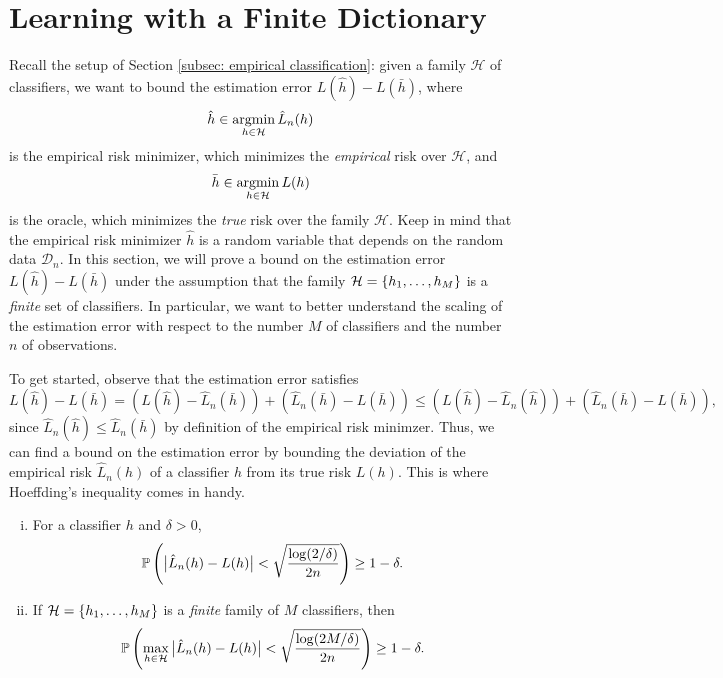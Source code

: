 \section{Learning with a Finite Dictionary}

Recall the setup of Section \ref{subsec: empirical classification}: given a family $\mathcal{H}$ of classifiers, we want to bound the estimation error $L(\hat h) - L(\bar h)$, where
\[
    \hat h \in \operatorname*{argmin}_{h \in \mathcal{H}} \hat L_n(h)
\]
is the empirical risk minimizer, which minimizes the \emph{empirical} risk over $\mathcal{H}$, and
\[
    \bar h \in \operatorname*{argmin}_{h \in \mathcal{H}} L(h)
\]
is the oracle, which minimizes the \emph{true} risk over the family $\mathcal{H}$. Keep in mind that the empirical risk minimizer $\hat h$ is a random variable that depends on the random data $\mathcal{D}_n$. In this section, we will prove a bound on the estimation error $L(\hat h) - L(\bar h)$ under the assumption that the family $\mathcal{H} = \left\{h_1, \dots, h_M\right\}$ is a \emph{finite} set of classifiers. In particular, we want to better understand the scaling of the estimation error with respect to the number $M$ of classifiers and the number $n$ of observations.

To get started, observe that the estimation error satisfies
\[
    L(\hat h) - L(\bar h) = \left(L(\hat h) - \hat L_n(\bar h)\right) + \left(\hat L_n(\bar h) - L(\bar h)\right) \leq \left(L(\hat h) - \hat L_n(\hat h)\right) + \left(\hat L_n(\bar h) - L(\bar h)\right),
\]
since $\hat L_n(\hat h) \leq \hat L_n(\bar h)$ by definition of the empirical risk minimzer. Thus, we can find a bound on the estimation error by bounding the deviation of the empirical risk $\hat L_n(h)$ of a classifier $h$ from its true risk $L(h)$. This is where Hoeffding's inequality comes in handy.

\begin{theorem}
\label{thm: empirical vs true risk}
\begin{enumerate}[(i)]
    \item For a classifier $h$ and $\delta > 0$,
    \[
        \mathbb{P}\left(\big\lvert \hat L_n(h) - L(h) \big\rvert < \sqrt{\frac{\log(2/\delta)}{2n}}\right) \geq 1 - \delta.
    \]

    \item If $\mathcal{H} = \left\{h_1, \dots, h_M\right\}$ is a \emph{finite} family of $M$ classifiers, then
    \[
        \mathbb{P}\left(\max_{h \in \mathcal{H}} \big\lvert \hat L_n(h) - L(h) \big\rvert < \sqrt{\frac{\log(2M/\delta)}{2n}}\right) \geq 1 - \delta.
    \]
\end{enumerate}
\end{theorem}

